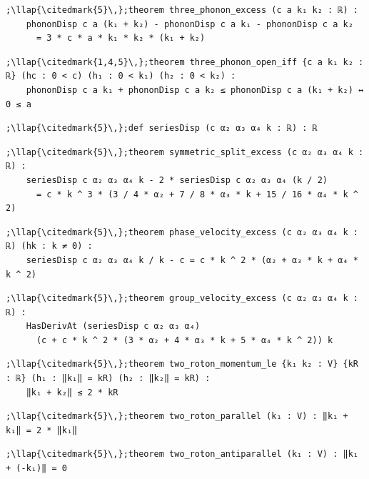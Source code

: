 \begin{lstlisting}[style=leancat]
;\llap{\citedmark{5}\,};theorem three_phonon_excess (c a k₁ k₂ : ℝ) :
    phononDisp c a (k₁ + k₂) - phononDisp c a k₁ - phononDisp c a k₂
      = 3 * c * a * k₁ * k₂ * (k₁ + k₂)
\end{lstlisting}

\begin{lstlisting}[style=leancat]
;\llap{\citedmark{1,4,5}\,};theorem three_phonon_open_iff {c a k₁ k₂ : ℝ} (hc : 0 < c) (h₁ : 0 < k₁) (h₂ : 0 < k₂) :
    phononDisp c a k₁ + phononDisp c a k₂ ≤ phononDisp c a (k₁ + k₂) ↔ 0 ≤ a
\end{lstlisting}

\begin{lstlisting}[style=leancat]
;\llap{\citedmark{5}\,};def seriesDisp (c α₂ α₃ α₄ k : ℝ) : ℝ
\end{lstlisting}

\begin{lstlisting}[style=leancat]
;\llap{\citedmark{5}\,};theorem symmetric_split_excess (c α₂ α₃ α₄ k : ℝ) :
    seriesDisp c α₂ α₃ α₄ k - 2 * seriesDisp c α₂ α₃ α₄ (k / 2)
      = c * k ^ 3 * (3 / 4 * α₂ + 7 / 8 * α₃ * k + 15 / 16 * α₄ * k ^ 2)
\end{lstlisting}

\begin{lstlisting}[style=leancat]
;\llap{\citedmark{5}\,};theorem phase_velocity_excess (c α₂ α₃ α₄ k : ℝ) (hk : k ≠ 0) :
    seriesDisp c α₂ α₃ α₄ k / k - c = c * k ^ 2 * (α₂ + α₃ * k + α₄ * k ^ 2)
\end{lstlisting}

\begin{lstlisting}[style=leancat]
;\llap{\citedmark{5}\,};theorem group_velocity_excess (c α₂ α₃ α₄ k : ℝ) :
    HasDerivAt (seriesDisp c α₂ α₃ α₄)
      (c + c * k ^ 2 * (3 * α₂ + 4 * α₃ * k + 5 * α₄ * k ^ 2)) k
\end{lstlisting}

\begin{lstlisting}[style=leancat]
;\llap{\citedmark{5}\,};theorem two_roton_momentum_le {k₁ k₂ : V} {kR : ℝ} (h₁ : ‖k₁‖ = kR) (h₂ : ‖k₂‖ = kR) :
    ‖k₁ + k₂‖ ≤ 2 * kR
\end{lstlisting}

\begin{lstlisting}[style=leancat]
;\llap{\citedmark{5}\,};theorem two_roton_parallel (k₁ : V) : ‖k₁ + k₁‖ = 2 * ‖k₁‖
\end{lstlisting}

\begin{lstlisting}[style=leancat]
;\llap{\citedmark{5}\,};theorem two_roton_antiparallel (k₁ : V) : ‖k₁ + (-k₁)‖ = 0
\end{lstlisting}

